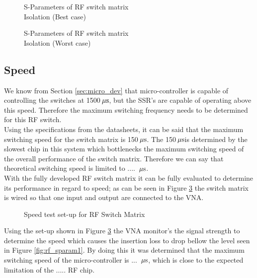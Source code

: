 \documentclass[12pt,openany,a4paper]{book}
\newcommand{\us}	{\ensuremath{\rm\,\mu s}}
\begin{document}




\begin{figure}[H]
	\centering
	\caption{S-Parameters of RF switch matrix\\ Isolation (Best case)}
	\label{fig:rf_sparam2}
\end{figure} 





\begin{figure}[H]
	\centering
	\caption{S-Parameters of RF switch matrix\\ Isolation (Worst case)}
	\label{fig:rf_sparam3}
\end{figure} 







\subsection{Speed}
We know from Section \ref{sec:micro_dev} that micro-controller is capable of controlling the switches at 1500\us , but the SSR's are capable of operating above this speed. Therefore the maximum switching frequency needs to be determined for this RF switch. \\
Using the specifications from the datasheets, it can be said that the maximum switching speed for the switch matrix is 150\us. The 150\us is determined by the slowest chip in this system which bottlenecks the maximum switching speed of the overall performance of the switch matrix. Therefore we can say that theoretical switching speed is limited to .... \us . \\[0.3cm]
With the fully developed RF switch matrix it can be fully evaluated to determine its performance in regard to speed; as can be seen in Figure \ref{fig:speedtest} the switch matrix is wired so that one input and output are connected to the VNA.
\begin{figure}[H]
	\centering
	\caption{Speed test set-up for RF Switch Matrix}
	\label{fig:speedtest}
\end{figure} 
Using the set-up shown in Figure \ref{fig:speedtest} the VNA monitor's the signal strength to determine the speed which causes the insertion loss to drop bellow the level seen in Figure \ref{fig:rf_sparam1}. By doing this it was determined that the maximum switching speed of the micro-controller is ... \us , which is close to the expected limitation of the ..... RF chip.
\end{document}
